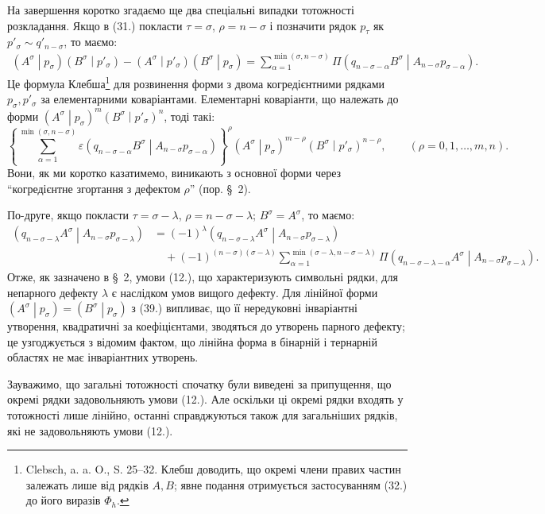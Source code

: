 \documentclass[11pt]{article}
\newcommand{\pair}[2]{\left(#1\middle|#2\right)}
\newcommand{\eps}{\varepsilon}
\begin{document}
На завершення коротко згадаємо ще два спеціальні випадки тотожності розкладання. Якщо в (31.) покласти $\tau=\sigma$, $\rho=n-\sigma$ і позначити рядок $p_\tau$ як $p'_\sigma\sim q'_{n-\sigma}$, то маємо:
\begin{equation}
\begin{aligned}
\pair{A^\sigma}{p_\sigma}\pair{B^\sigma}{p'_\sigma}
-\pair{A^\sigma}{p'_\sigma}\pair{B^\sigma}{p_\sigma}
=\sum_{\alpha=1}^{\min(\sigma,n-\sigma)}
\Pi\pair{q_{n-\sigma-\alpha}B^\sigma}{A_{n-\sigma}p_{\sigma-\alpha}}.
\end{aligned}
\tag{37}
\end{equation}
Це формула Клебша\footnote{Clebsch, a. a. O., S. 25--32. Клебш доводить, що окремі члени правих частин залежать лише від рядків $A,B$; явне подання отримується застосуванням (32.) до його виразів $\Phi_h$.} для розвинення форми з двома когредієнтними рядками $p_\sigma,p'_\sigma$ за елементарними коваріантами. Елементарні коваріанти, що належать до форми $\pair{A^\sigma}{p_\sigma}^m\pair{B^\sigma}{p'_\sigma}^n$, тоді такі:
\begin{equation}
 \left\{\sum_{\alpha=1}^{\min(\sigma,n-\sigma)}
 \eps\pair{q_{n-\sigma-\alpha}B^\sigma}{A_{n-\sigma}p_{\sigma-\alpha}}
 \right\}^{\rho}
 \pair{A^\sigma}{p_\sigma}^{m-\rho}\pair{B^\sigma}{p'_\sigma}^{n-\rho},
 \qquad (\rho=0,1,\ldots,m,n).
\tag{38}
\end{equation}
Вони, як ми коротко казатимемо, виникають з основної форми через ``когредієнтне згортання з дефектом $\rho$'' (пор. \S\ 2).

По-друге, якщо покласти $\tau=\sigma-\lambda$, $\rho=n-\sigma-\lambda$; $B^\sigma=A^\sigma$, то маємо:
\begin{equation}
\begin{aligned}
\pair{q_{n-\sigma-\lambda}A^\sigma}{A_{n-\sigma}p_{\sigma-\lambda}}
&=(-1)^\lambda
\pair{q_{n-\sigma-\lambda}A^\sigma}{A_{n-\sigma}p_{\sigma-\lambda}}\\
&\quad+(-1)^{(n-\sigma)(\sigma-\lambda)}
 \sum_{\alpha=1}^{\min(\sigma-\lambda,n-\sigma-\lambda)}
 \Pi\pair{q_{n-\sigma-\lambda-\alpha}A^\sigma}
 {A_{n-\sigma}p_{\sigma-\lambda}}.
\end{aligned}
\tag{39}
\end{equation}
Отже, як зазначено в \S\ 2, умови (12.), що характеризують символьні рядки, для непарного дефекту $\lambda$ є наслідком умов вищого дефекту. Для лінійної форми $\pair{A^\sigma}{p_\sigma}=\pair{B^\sigma}{p_\sigma}$ з (39.) випливає, що її нередуковні інваріантні утворення, квадратичні за коефіцієнтами, зводяться до утворень парного дефекту; це узгоджується з відомим фактом, що лінійна форма в бінарній і тернарній областях не має інваріантних утворень.

Зауважимо, що загальні тотожності спочатку були виведені за припущення, що окремі рядки задовольняють умови (12.). Але оскільки ці окремі рядки входять у тотожності лише лінійно, останні справджуються також для загальніших рядків, які не задовольняють умови (12.).
\end{document}
